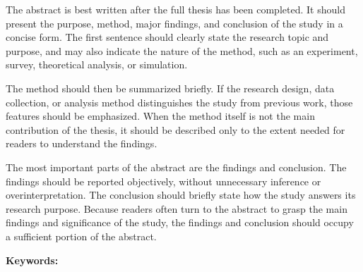 \begingroup
{}
\normalfont\normalsize\selectfont

\noindent
The abstract is best written after the full thesis has been completed.
It should present the purpose, method, major findings, and conclusion of the study in a concise form.
The first sentence should clearly state the research topic and purpose, and may also indicate the nature of the method, such as an experiment, survey, theoretical analysis, or simulation.

The method should then be summarized briefly.
If the research design, data collection, or analysis method distinguishes the study from previous work, those features should be emphasized.
When the method itself is not the main contribution of the thesis, it should be described only to the extent needed for readers to understand the findings.

The most important parts of the abstract are the findings and conclusion.
The findings should be reported objectively, without unnecessary inference or overinterpretation.
The conclusion should briefly state how the study answers its research purpose.
Because readers often turn to the abstract to grasp the main findings and significance of the study, the findings and conclusion should occupy a sufficient portion of the abstract.

\vskip 0.5cm
\noindent
\textbf{Keywords:} \thesiskeywordsEng

\vfill

\endgroup
\endgroup
